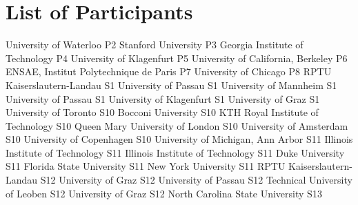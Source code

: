 \chapter{List of Participants}

\setlength{\columnsep}{1cm}

\begin{multicols}{2}

\small\raggedright

{University of Waterloo}
{P2}
{}
{Stanford University}
{P3}
{}
{Georgia Institute of Technology}
{P4}
{}
{University of Klagenfurt}
{P5}
{}
{University of California, Berkeley}
{P6}
{}
{ENSAE, Institut Polytechnique de Paris}
{P7}
{}
{University of Chicago}
{P8}
{}
{RPTU Kaiserslautern-Landau}
{S1}
{}
{University of Passau}
{S1}
{}
{University of Mannheim}
{S1}
{}
{University of Passau}
{S1}
{}
{University of Klagenfurt}
{S1}
{}
{University of Graz}
{S1}
{}
{University of Toronto}
{S10}
{}
{Bocconi University}
{S10}
{}
{KTH Royal Institute of Technology}
{S10}
{}
{Queen Mary University of London}
{S10}
{}
{University of Amsterdam}
{S10}
{}
{University of Copenhagen}
{S10}
{}
{University of Michigan, Ann Arbor}
{S11}
{}
{Illinois Institute of Technology}
{S11}
{}
{Illinois Institute of Technology}
{S11}
{}
{Duke University}
{S11}
{}
{Florida State University}
{S11}
{}
{New York University}
{S11}
{}
{RPTU Kaiserslautern-Landau}
{S12}
{}
{University of Graz}
{S12}
{}
{University of Passau}
{S12}
{}
{Technical University of Leoben}
{S12}
{}
{University of Graz}
{S12}
{}
{North Carolina State University}
{S13}
{}

\end{multicols}
